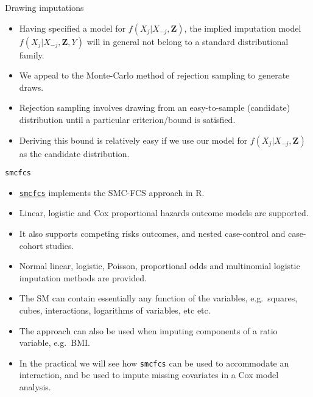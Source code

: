 \documentclass[ignorenonframetext,]{beamer}
\providecommand{\tightlist}{%
  \setlength{\itemsep}{0pt}\setlength{\parskip}{0pt}}
\begin{document}
\begin{frame}{Drawing imputations}
\protect\hypertarget{drawing-imputations}{}

\begin{itemize}
\tightlist
\item
  Having specified a model for \(f(X_{j}|X_{-j},\mathbf Z)\), the
  implied imputation model \(f(X_{j}|X_{-j},\mathbf Z,Y)\) will in
  general not belong to a standard distributional family.
\item
  We appeal to the Monte-Carlo method of rejection sampling to generate
  draws.
\item
  Rejection sampling involves drawing from an easy-to-sample (candidate)
  distribution until a particular criterion/bound is satisfied.
\item
  Deriving this bound is relatively easy if we use our model for
  \(f(X_{j}|X_{-j},\mathbf Z)\) as the candidate distribution.
\end{itemize}

\end{frame}

\begin{frame}[fragile]{\texttt{smcfcs}}
\protect\hypertarget{smcfcs}{}

\begin{itemize}
\tightlist
\item
  \href{https://cran.r-project.org/package=smcfcs}{\texttt{smcfcs}}
  implements the SMC-FCS approach in R.
\item
  Linear, logistic and Cox proportional hazards outcome models are
  supported.
\item
  It also supports competing risks outcomes, and nested case-control and
  case-cohort studies.
\item
  Normal linear, logistic, Poisson, proportional odds and multinomial
  logistic imputation methods are provided.
\item
  The SM can contain essentially any function of the variables,
  e.g.~squares, cubes, interactions, logarithms of variables, etc etc.
\item
  The approach can also be used when imputing components of a ratio
  variable, e.g.~BMI.
\item
  In the practical we will see how \texttt{smcfcs} can be used to
  accommodate an interaction, and be used to impute missing covariates
  in a Cox model analysis.
\end{itemize}

\end{frame}
\end{document}
